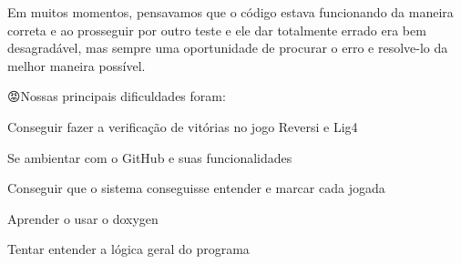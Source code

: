 Em muitos momentos, pensavamos que o código estava funcionando da maneira correta e ao prosseguir por outro teste e ele dar totalmente errado era bem desagradável, mas sempre uma oportunidade de procurar o erro e resolve-\/lo da melhor maneira possível.

😡\+Nossas principais dificuldades foram\+:


\begin{DoxyItemize}
\item Conseguir fazer a verificação de vitórias no jogo Reversi e Lig4
\item Se ambientar com o Git\+Hub e suas funcionalidades
\item Conseguir que o sistema conseguisse entender e marcar cada jogada
\item Aprender o usar o doxygen
\item Tentar entender a lógica geral do programa 
\end{DoxyItemize}